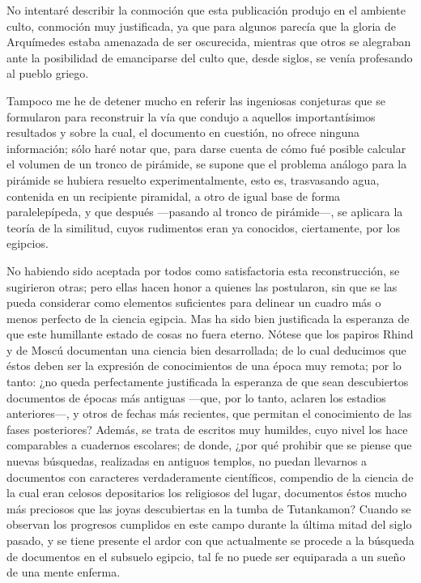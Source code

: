 \documentclass[a4paper, 12pt, draft]{article}
\begin{document}
No intentaré describir la conmoción que esta publicación produjo en el ambiente culto, conmoción muy justificada, ya que para algunos  parecía que
la gloria de Arquímedes estaba amenazada de ser oscurecida, mientras que otros se alegraban ante la posibilidad de emanciparse del culto que, desde siglos, se venía profesando al pueblo griego.

Tampoco me he de detener mucho en referir las ingeniosas conjeturas que se formularon para reconstruir la vía que condujo a aquellos importantísimos resultados y sobre la cual, el documento en cuestión, no ofrece ninguna información; sólo haré notar que, para darse cuenta de cómo fué posible calcular el volumen de un tronco de pirámide, se supone que el problema análogo para la pirámide se hubiera resuelto experimentalmente, esto es, trasvasando agua, contenida en un recipiente piramidal, a otro de igual base de forma paralelepípeda, y que después ---pasando al tronco de pirámide---, se aplicara la teoría de la similitud, cuyos rudimentos eran ya conocidos,  ciertamente, por los egipcios.

No habiendo sido aceptada por todos como
satisfactoria esta reconstrucción, se sugirieron otras; pero ellas hacen honor a quienes las postularon, sin que se las pueda considerar como elementos suficientes para delinear un cuadro más o menos perfecto de la ciencia egipcia. Mas ha sido bien
justificada la esperanza de que este humillante estado de cosas no fuera eterno. Nótese que los papiros Rhind y de Moscú documentan una ciencia bien desarrollada; de lo cual deducimos que éstos deben ser la expresión de conocimientos de una época muy remota; por lo tanto: ¿no queda perfectamente justificada la esperanza de que sean descubiertos documentos de épocas más antiguas ---que, por lo tanto, aclaren los estadios anteriores---, y otros de fechas más recientes, que permitan el conocimiento de las fases posteriores? Además, se trata de escritos muy humildes, cuyo nivel los hace comparables a cuadernos escolares; de donde, ¿por qué prohibir que se piense que nuevas búsquedas, realizadas en antiguos templos, no puedan llevarnos a documentos con caracteres verdaderamente científicos, compendio de la ciencia de la cual eran celosos depositarios los religiosos del lugar, documentos éstos mucho más preciosos que las joyas descubiertas en la tumba de Tutankamon? Cuando se observan los progresos cumplidos en este campo durante la última mitad del siglo pasado, y se tiene presente el ardor con que actualmente se procede a la búsqueda de documentos en el subsuelo egipcio, tal fe no puede ser equiparada a un sueño de una mente enferma.
\end{document}
